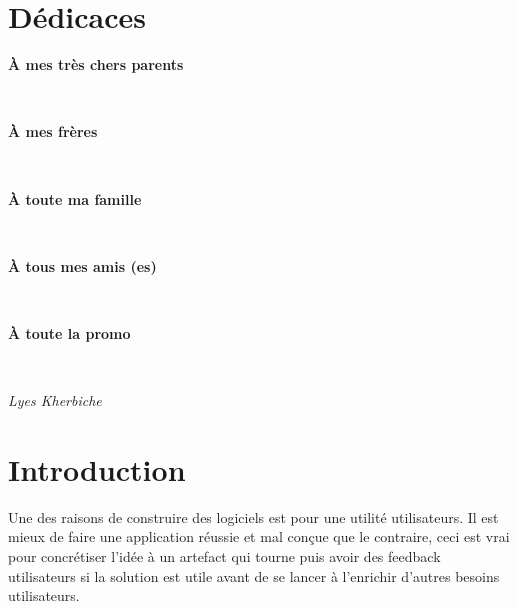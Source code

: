\documentclass[12pt, a4paper, openany]{report}
\begin{document}
   
\chapter*{Dédicaces}
\begin{center}
\begin{Large} \textbf{À mes très chers parents} \end{Large}\\ 
\begin{Large} \textbf{À mes frères} \end{Large}\\
\begin{Large} \textbf{À toute ma famille} \end{Large}\\
\begin{Large} \textbf{À tous mes amis (es)} \end{Large} \\ 
\begin{Large} \textbf{À toute la promo} \end{Large}\\
\end{center}
\begin{flushright} \begin{Large} \textit{Lyes Kherbiche} \end{Large} \end{flushright}

\tableofcontents
\listoffigures
\listoftables



\chapter*{Introduction}
 
  Une des raisons de construire des logiciels est pour une utilité utilisateurs. Il est mieux de faire une application réussie et mal conçue que le contraire, ceci est vrai pour concrétiser l'idée à un artefact qui tourne puis avoir des feedback utilisateurs si la solution est utile avant de se lancer à l’enrichir d'autres besoins utilisateurs. \\
  
\end{document}
